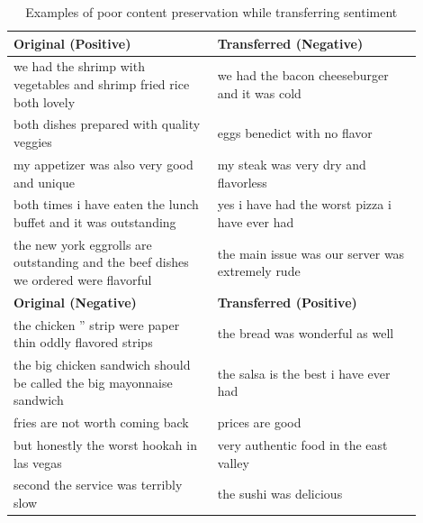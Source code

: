 \begin{table}[ht]
	\centering
	\begin{tabular}{| p{0.45\linewidth} | p{0.45\linewidth} |}
		\hline
		\textbf{{Original (Positive)}}                                                      & \textbf{Transferred (Negative)}                  \\
		\hline
		\hline
		we had the shrimp with vegetables and shrimp fried rice both lovely                 & we had the bacon cheeseburger and it was cold    \\
		\hline
		both dishes prepared with quality veggies                                           & eggs benedict with no flavor                     \\
		\hline
		my appetizer was also very good and unique                                          & my steak was very dry and flavorless             \\
		\hline
		both times i have eaten the lunch buffet and it was outstanding                     & yes i have had the worst pizza i have ever had   \\
		\hline
		the new york eggrolls are outstanding and the beef dishes we ordered were flavorful & the main issue was our server was extremely rude \\
		\hline
		\hline
		\textbf{{Original (Negative)}}                                                      & \textbf{Transferred (Positive)}                  \\
		\hline
		\hline
		the chicken '' strip were paper thin oddly flavored strips                          & the bread was wonderful as well                  \\
		\hline
		the big chicken sandwich should be called the big mayonnaise sandwich               & the salsa is the best i have ever had            \\
		\hline
		fries are not worth coming back                                                     & prices are good                                  \\
		\hline
		but honestly the worst hookah in las vegas                                          & very authentic food in the east valley           \\
		\hline
		second the service was terribly slow                                                & the sushi was delicious                          \\
		\hline
	\end{tabular}
	\caption{Examples of poor content preservation while transferring sentiment}
	\label{tab:poor-content-preservation}
\end{table}

